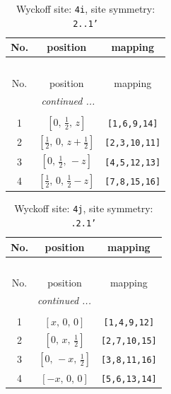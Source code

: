 \documentclass[fleqn,8pt]{jsarticle}
\begin{document}
\renewcommand{\arraystretch}{1.2}
\begin{longtable}{ccc}
\caption{Wyckoff site: {\tt 4i}, site symmetry: {\tt 2..1'}}
 \\
 \hline \hline
No. & position & mapping \\ \hline \endfirsthead

\multicolumn{2}{l}{\tablename\ \thetable{}} \\
 \hline \hline
No. & position & mapping \\ \hline \endhead

 \hline \hline
\multicolumn{2}{r}{\footnotesize\it continued ...} \\ \endfoot

 \hline \hline
\multicolumn{2}{r}{} \\ \endlastfoot

1 & $\left[ 0,\, \frac{1}{2},\, z \right]$ & {\tt [1,6,9,14]} \\ \hline
2 & $\left[ \frac{1}{2},\, 0,\, z + \frac{1}{2} \right]$ & {\tt [2,3,10,11]} \\ \hline
3 & $\left[ 0,\, \frac{1}{2},\, - z \right]$ & {\tt [4,5,12,13]} \\ \hline
4 & $\left[ \frac{1}{2},\, 0,\, \frac{1}{2} - z \right]$ & {\tt [7,8,15,16]} \\
\end{longtable}
\renewcommand{\arraystretch}{1.2}
\begin{longtable}{ccc}
\caption{Wyckoff site: {\tt 4j}, site symmetry: {\tt .2.1'}}
 \\
 \hline \hline
No. & position & mapping \\ \hline \endfirsthead

\multicolumn{2}{l}{\tablename\ \thetable{}} \\
 \hline \hline
No. & position & mapping \\ \hline \endhead

 \hline \hline
\multicolumn{2}{r}{\footnotesize\it continued ...} \\ \endfoot

 \hline \hline
\multicolumn{2}{r}{} \\ \endlastfoot

1 & $\left[ x,\, 0,\, 0 \right]$ & {\tt [1,4,9,12]} \\ \hline
2 & $\left[ 0,\, x,\, \frac{1}{2} \right]$ & {\tt [2,7,10,15]} \\ \hline
3 & $\left[ 0,\, - x,\, \frac{1}{2} \right]$ & {\tt [3,8,11,16]} \\ \hline
4 & $\left[ - x,\, 0,\, 0 \right]$ & {\tt [5,6,13,14]} \\
\end{longtable}
\end{document}
